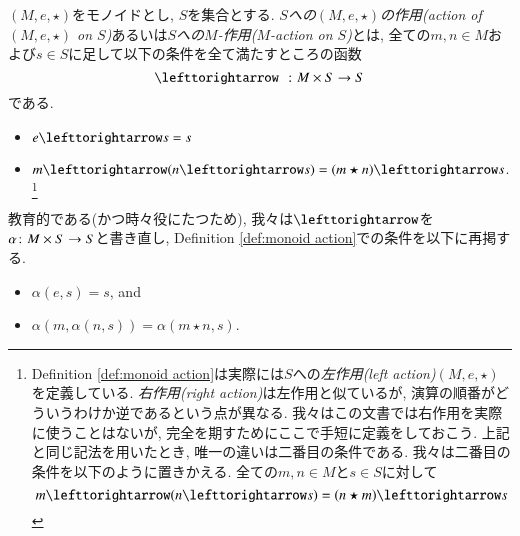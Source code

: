 \begin{definition}[モノイド作用]\label{def:monoid action}


$(M,e,\star)$をモノイドとし, $S$を集合とする. \emph{$S$への$(M,e,\star)$の作用(action of $(M,e,\star)$ on $S$)}あるいは\emph{$S$への$M$-作用($M$-action on $S$)}とは, 全ての$m,n\in M$および$s\in S$に足して以下の条件を全て満たすところの函数$$\acts\;\;\taking M\times S\to S$$である.
\begin{itemize}
\item $e\acts s=s$
\item $m\acts(n\acts s)=(m\star n)\acts s$.
\footnote{
Definition \ref{def:monoid action}は実際には$S$への\emph{左作用(left action)}$(M,e,\star)$を定義している. \emph{右作用(right action)}は左作用と似ているが, 演算の順番がどういうわけか逆であるという点が異なる. 我々はこの文書では右作用を実際に使うことはないが, 完全を期すためにここで手短に定義をしておこう. 上記と同じ記法を用いたとき, 唯一の違いは二番目の条件である. 我々は二番目の条件を以下のように置きかえる. 全ての$m,n\in M$と$s\in S$に対して
$$m\acts(n\acts s)=(n\star m)\acts s
$$}
\end{itemize}

\end{definition}

\begin{remark}\label{rmk:monoid action}

教育的である(かつ時々役にたつため), 我々は$\acts$を$\alpha\colon M\times S\rightarrow S$と書き直し, Definition \ref{def:monoid action}での条件を以下に再掲する.
\begin{itemize}
\item $\alpha(e,s)=s$, and
\item $\alpha(m,\alpha(n,s))=\alpha(m\star n,s)$.
\end{itemize}

\end{remark}

